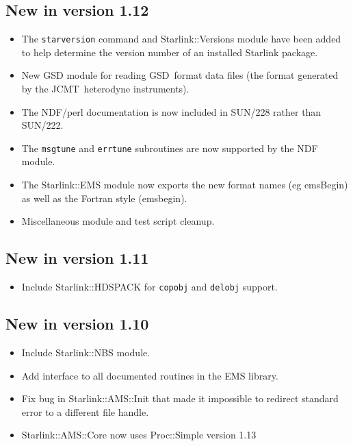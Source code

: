 \documentclass[twoside,11pt]{article}
\newcommand{\gsd}{\xref{{GSD}}{sun229}{}}
\newcommand{\jcmt}{\htmladdnormallink{JCMT}{http://www.jach.hawaii.edu/JACpublic/JCMT}}
\newcommand{\htmladdnormallink}[2]{#1}
\newcommand{\xref}[3]{#1}
\renewcommand{\_}{\texttt{\symbol{95}}}
\begin{document}
\subsection{New in version 1.12}

\begin{itemize}
\item The \texttt{starversion} command and Starlink::Versions module have 
been added to help determine the version number of an installed Starlink
package.

\item New GSD module for reading \gsd\ format data files (the format generated
  by the \jcmt\ heterodyne instruments).

\item The NDF/perl documentation is now included in SUN/228 rather than
  SUN/222.

\item The \texttt{msg\_tune} and \texttt{err\_tune} subroutines are now 
supported by the NDF module.

\item The Starlink::EMS module now exports the new format names (eg emsBegin)
  as well as the Fortran style (ems\_begin).

\item Miscellaneous module and test script cleanup.

\end{itemize}

\subsection{New in version 1.11}

\begin{itemize}
\item Include Starlink::HDSPACK for \texttt{copobj} and \texttt{delobj}
support.

\end{itemize}

\subsection{New in version 1.10}

\begin{itemize}
\item Include Starlink::NBS module.
\item Add interface to all documented routines in the EMS library.
\item Fix bug in Starlink::AMS::Init that made it impossible to redirect
standard error to a different file handle.
\item Starlink::AMS::Core now uses Proc::Simple version 1.13
\end{itemize}
\end{document}
